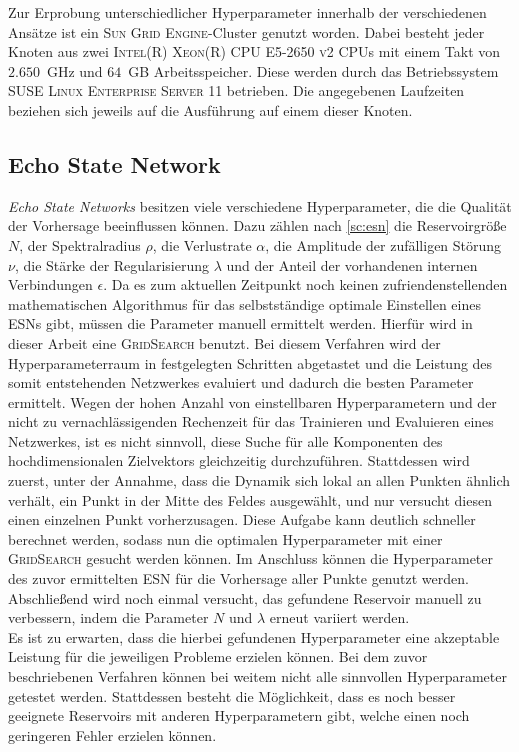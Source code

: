 Zur Erprobung unterschiedlicher Hyperparameter innerhalb der verschiedenen Ansätze ist ein \textsc{Sun Grid Engine}-Cluster genutzt worden. Dabei besteht jeder Knoten aus zwei \textsc{Intel(R) Xeon(R) CPU E5-2650 v2} CPUs mit einem Takt von $2.650$~GHz und $64$~GB Arbeitsspeicher. Diese werden durch das Betriebssystem \textsc{SUSE Linux Enterprise Server 11} betrieben. Die angegebenen Laufzeiten beziehen sich jeweils auf die Ausführung auf einem dieser Knoten. 


\FloatBarrier
\subsection{Echo State Network}
\label{sec:exp_general_esn}
\textit{Echo State Networks} besitzen viele verschiedene Hyperparameter, die die Qualität der Vorhersage beeinflussen können. Dazu zählen nach \ref{sc:esn} die Reservoirgröße $N$, der Spektralradius $\rho$, die Verlustrate $\alpha$, die Amplitude der zufälligen Störung $\nu$, die Stärke der Regularisierung $\lambda$ und der Anteil der vorhandenen internen Verbindungen $\epsilon$. Da es zum aktuellen Zeitpunkt noch keinen zufriendenstellenden mathematischen Algorithmus für das selbstständige optimale Einstellen eines \textsc{ESN}s gibt, müssen die Parameter manuell ermittelt werden. Hierfür wird in dieser Arbeit eine \textsc{GridSearch} benutzt. Bei diesem Verfahren wird der Hyperparameterraum in festgelegten Schritten abgetastet und die Leistung des somit entstehenden Netzwerkes evaluiert und dadurch die besten Parameter ermittelt. Wegen der hohen Anzahl von einstellbaren Hyperparametern und der nicht zu vernachlässigenden Rechenzeit für das Trainieren und Evaluieren eines Netzwerkes, ist es nicht sinnvoll, diese Suche für alle Komponenten des hochdimensionalen Zielvektors gleichzeitig durchzuführen. Stattdessen wird zuerst, unter der Annahme, dass die Dynamik sich lokal an allen Punkten ähnlich verhält, ein Punkt in der Mitte des Feldes ausgewählt, und nur versucht diesen einen einzelnen Punkt vorherzusagen. Diese Aufgabe kann deutlich schneller berechnet werden, sodass nun die optimalen Hyperparameter mit einer \textsc{GridSearch} gesucht werden können. Im Anschluss können die Hyperparameter des  zuvor ermittelten \textsc{ESN} für die Vorhersage aller Punkte genutzt werden. Abschließend wird noch einmal versucht, das gefundene Reservoir manuell zu verbessern, indem die Parameter $N$ und $\lambda$ erneut variiert werden.\\
Es ist zu erwarten, dass die hierbei gefundenen Hyperparameter eine akzeptable Leistung für die jeweiligen Probleme erzielen können. Bei dem zuvor beschriebenen Verfahren können bei weitem nicht alle sinnvollen Hyperparameter getestet werden. Stattdessen besteht die Möglichkeit, dass es noch besser geeignete Reservoirs mit anderen Hyperparametern gibt, welche einen noch geringeren Fehler erzielen können.\\

